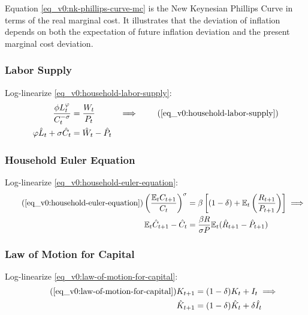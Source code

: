 \documentclass[../thesis.tex]{subfiles}
\begin{document}
	Equation \ref{eq_v0:nk-phillips-curve-mc} is the New Keynesian Phillips Curve in terms of the real marginal cost. It illustrates that the deviation of inflation depends on both the expectation of future inflation deviation and the present marginal cost deviation.
	
	
	\subsubsection*{Labor Supply}
	
	Log-linearize \ref{eq_v0:household-labor-supply}:
	\begin{alignat}{2}
		\frac{\phi L_t^{\varphi}}{C_t^{-\sigma}} &= \frac{W_t}{P_t} & \implies \tag{\ref{eq_v0:household-labor-supply}} \\
		\varphi \hat{L}_t + \sigma \hat{C}_t &= \hat{W}_t - \hat{P}_t & \label{eq_v0:ll-labor-supply}
	\end{alignat}
	
	
	\subsubsection*{Household Euler Equation}
	
	Log-linearize \ref{eq_v0:household-euler-equation}:
	\begin{align}
		\tag{\ref{eq_v0:household-euler-equation}}
		\left( \frac{\mathbb{E}_t C_{t+1}}{C_t} \right)^\sigma &= \beta \left[ (1-\delta) + \mathbb{E}_t \left(\frac{R_{t+1}}{P_{t+1}}\right) \right] \implies \\
		\label{eq_v0:ll-household-euler-equation}
		\E \hat{C}_{t+1} - \hat{C}_t &= \frac{\beta R}{\sigma P} \E(\hat{R}_{t+1} - \hat{P}_{t+1})
	\end{align}
	
	
	\subsubsection*{Law of Motion for Capital}
	
	Log-linearize \ref{eq_v0:law-of-motion-for-capital}:
	\begin{align}
		\tag{\ref{eq_v0:law-of-motion-for-capital}}
		K_{t+1} &= (1-\delta)K_t + I_t \implies \\
		\label{eq_v0:ll-law-of-motion-for-capital}
		\hat{K}_{t+1} &= (1-\delta)\hat{K}_t + \delta \hat{I}_t
	\end{align}
	
\end{document}
